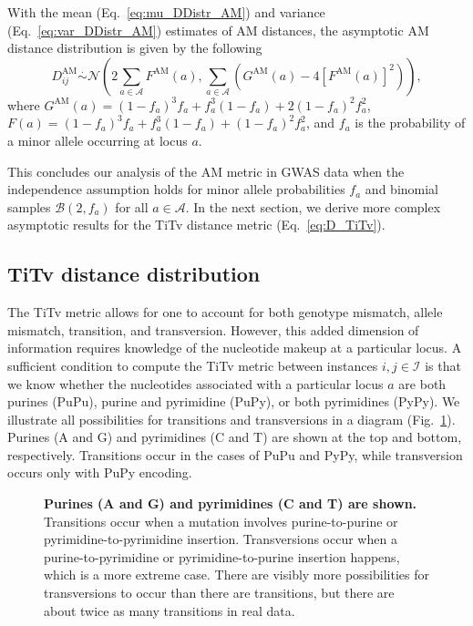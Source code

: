 \documentclass[10pt,letterpaper]{article}
\begin{document}
With the mean (Eq.~\ref{eq:mu_DDistr_AM}) and variance (Eq.~\ref{eq:var_DDistr_AM}) estimates of AM distances, the asymptotic AM distance distribution is given by the following
%
\begin{equation}\label{eq:DDistr_AM}
D^\text{AM}_{ij} \overset{.}{\sim} \mathcal{N}\left(2\sum_{a \in \mathcal{A}} F^\text{AM}(a), \sum_{a \in \mathcal{A}} \left(G^\text{AM}(a)- 4\left[F^\text{AM}(a)\right]^2\right)\right),
\end{equation}
%
where $G^\text{AM}(a) = (1 - f_a)^3 f_a + f^3_a (1 - f_a) + 2 (1 - f_a)^2 f^2_a$, $F(a) = (1 - f_a)^3 f_a + f^3_a (1 - f_a) + (1 - f_a)^2 f^2_a$, and $f_a$ is the probability of a minor allele occurring at locus $a$.

This concludes our analysis of the AM metric in GWAS data when the independence assumption holds for minor allele probabilities $f_a$ and binomial samples $\mathcal{B}(2,f_a)$ for all $a \in \mathcal{A}$. In the next section, we derive more complex asymptotic results for the TiTv distance metric (Eq.~\ref{eq:D_TiTv}).

\subsection{TiTv distance distribution}\label{sec:TiTv_distances}

The TiTv metric allows for one to account for both genotype mismatch, allele mismatch, transition, and transversion. However, this added dimension of information requires knowledge of the nucleotide makeup at a particular locus. A sufficient condition to compute the TiTv metric between instances $i,j \in \mathcal{I}$ is that we know whether the nucleotides associated with a particular locus $a$ are both purines (PuPu), purine and pyrimidine (PuPy), or both pyrimidines (PyPy). We illustrate all possibilities for transitions and transversions in a diagram (Fig.~\ref{fig:TiTv_diagram}). Purines (A and G) and pyrimidines (C and T) are shown at the top and bottom, respectively. Transitions occur in the cases of PuPu and PyPy, while transversion occurs only with PuPy encoding.

\begin{figure}[H]
	\centering
	\caption{{\bf Purines (A and G) and pyrimidines (C and T) are shown.} Transitions occur when a mutation involves purine-to-purine or pyrimidine-to-pyrimidine insertion. Transversions occur when a purine-to-pyrimidine or pyrimidine-to-purine insertion happens, which is a more extreme case. There are visibly more possibilities for transversions to occur than there are transitions, but there are about twice as many transitions in real data.}\label{fig:TiTv_diagram}
\end{figure}
\end{document}
